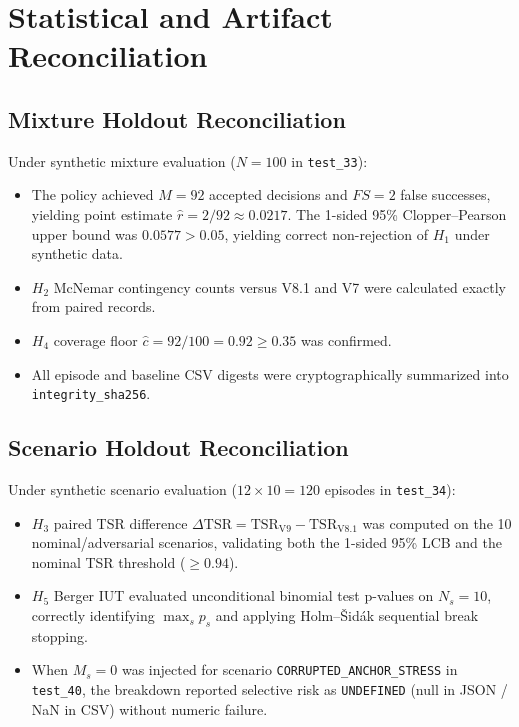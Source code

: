 \documentclass[10pt,a4paper]{article}
\begin{document}
\section{Statistical and Artifact Reconciliation}

\subsection{Mixture Holdout Reconciliation}
Under synthetic mixture evaluation ($N=100$ in \texttt{test\_33}):
\begin{itemize}
    \item The policy achieved $M = 92$ accepted decisions and $FS = 2$ false successes, yielding point estimate $\hat{r} = 2 / 92 \approx 0.0217$. The 1-sided 95\% Clopper--Pearson upper bound was $0.0577 > 0.05$, yielding correct non-rejection of $H_1$ under synthetic data.
    \item $H_2$ McNemar contingency counts versus V8.1 and V7 were calculated exactly from paired records.
    \item $H_4$ coverage floor $\hat{c} = 92 / 100 = 0.92 \ge 0.35$ was confirmed.
    \item All episode and baseline CSV digests were cryptographically summarized into \texttt{integrity\_sha256}.
\end{itemize}

\subsection{Scenario Holdout Reconciliation}
Under synthetic scenario evaluation ($12 \times 10 = 120$ episodes in \texttt{test\_34}):
\begin{itemize}
    \item $H_3$ paired TSR difference $\Delta\text{TSR} = \text{TSR}_{\text{V9}} - \text{TSR}_{\text{V8.1}}$ was computed on the 10 nominal/adversarial scenarios, validating both the 1-sided 95\% LCB and the nominal TSR threshold ($\ge 0.94$).
    \item $H_5$ Berger IUT evaluated unconditional binomial test p-values on $N_s = 10$, correctly identifying $\max_s p_s$ and applying Holm--Šidák sequential break stopping.
    \item When $M_s = 0$ was injected for scenario \texttt{CORRUPTED\_ANCHOR\_STRESS} in \texttt{test\_40}, the breakdown reported selective risk as \texttt{UNDEFINED} (null in JSON / NaN in CSV) without numeric failure.
\end{itemize}
\end{document}
